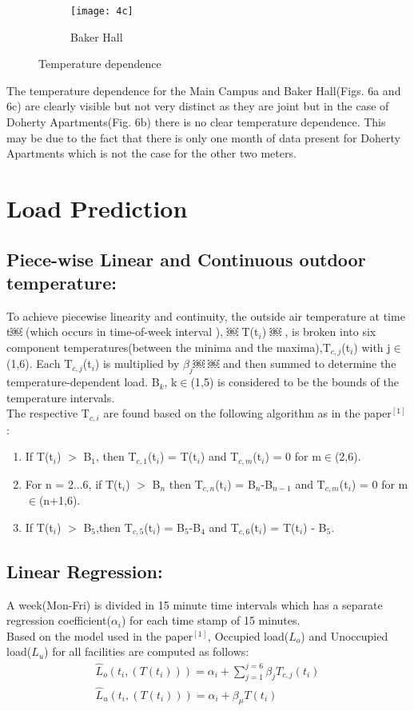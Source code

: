 \documentclass[a4paper,11pt]{article}
\begin{document}
\begin{itemize}
\begin{figure}[H]
\hspace{-10pt}      
        \begin{subfigure}[b]{0.35\textwidth}
                \texttt{[image: 4c]}
                \caption{Baker Hall}
                \label{fig:tiger}
        \end{subfigure}
        \caption{Temperature dependence}\label{fig:animals}
\end{figure}
\noindent The temperature dependence for the Main Campus and Baker Hall(Figs. 6a and 6c) are clearly visible but not very distinct as they are joint but in the case of Doherty Apartments(Fig. 6b) there is no clear temperature dependence. This may be due to the fact that there is only one month of data present for Doherty Apartments which is not the case for the other two meters.
\section{Load Prediction}
\subsection{Piece-wise Linear and Continuous outdoor temperature:}
To achieve piecewise linearity and continuity, the outside air
temperature at time t￼ (which occurs in time-of-week interval ), ￼ T(t$_i$) ￼ , is broken into six component temperatures(between the minima and the maxima),T$_{c,j}$(t$_i$)
with j$\in$(1,6).
Each T$_{c,j}$(t$_i$) is multiplied by $\beta_j$￼ ￼ and then summed to determine the temperature-dependent load. B$_k$, k$\in$(1,5) is considered to be the bounds of the temperature intervals.\\
The respective T$_{c,i}$ are found based on the following algorithm as in the paper$^{[1]}$:
\begin{enumerate}
\itemsep0em 
\item If T(t$_i$) $>$ B$_1$, then T$_{c,1}$(t$_i$) = T(t$_i$) and T$_{c,m}$(t$_i$) = 0 for m$\in$(2,6). 
\item For n = 2...6, if T(t$_i$) $>$ B$_n$ then T$_{c,n}$(t$_i$) = B$_n$-B$_{n-1}$ and T$_{c,m}$(t$_i$) = 0 for m$\in$(n+1,6).
\item If T(t$_i$) $>$ B$_5$,then T$_{c,5}$(t$_i$) = B$_5$-B$_4$ and T$_{c,6}$(t$_i$) = T(t$_i$) - B$_5$.
\end{enumerate}
\subsection{Linear Regression:}
A week(Mon-Fri) is divided in 15 minute time intervals which has a separate regression coefficient($\alpha_i$) for each time stamp of 15 minutes.\\
Based on the model used in the paper$^{[1]}$, Occupied load($L_o$) and Unoccupied load($L_u$) for all facilities are computed as follows:
\begin{align}
\hat{L}_o(t_i,(T(t_i)))=\alpha_i + \sum_{j=1}^{j=6} \beta_jT_{c,j}(t_i)\\
\hat{L}_u(t_i,(T(t_i)))=\alpha_i + \beta_\mu T(t_i)
\end{align}

\end{itemize}
\end{document}
